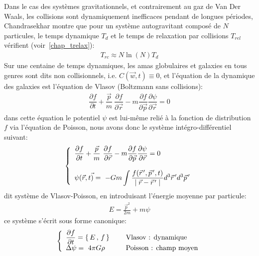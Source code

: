 Dans le cas des systèmes gravitationnels, et contrairement au gaz de Van Der Waals, les collisions sont dynamiquement inefficaces pendant de longues
périodes, Chandrasekhar montre que pour un système autogravitant composé de $N$ particules, le temps dynamique $T_{d}$ et le temps de
relaxation par collisions $T_{rel}$ vérifient (voir~\ref{chap_trelax}):
\begin{align*}
	T_{rc}\approx N\ln\left(  N\right)  T_{d}%
\end{align*}
Sur une centaine de temps dynamiques, les amas globulaires et galaxies en tous genres sont dits non collisionnels, i.e. $C\left(  \vec{w}
,t\right)  \equiv0$, et l'équation de la dynamique des galaxies est l'équation de Vlasov (Boltzmann sans collisions):
\begin{align*}
	\dfrac{\partial f}{\partial t}+\dfrac{\vec{p}}{m}\ \dfrac{\partial f}{\partial\vec{r}}-m\dfrac{\partial f}{\partial\vec{p}}\dfrac
	{\partial\psi}{\partial\vec{r}}=0
\end{align*}
dans cette équation le potentiel $\psi$ est lui-même relié à la fonction de distribution $f$ via l'équation de Poisson, nous avons donc le système
intégro-différentiel suivant:
\begin{align*}
	\left\{
		\begin{array}[c]{l}%
			\dfrac{\partial f}{\partial t}+\dfrac{\vec{p}}{m}\ \dfrac{\partial f}{\partial\vec{r}}-m\dfrac{\partial f}{\partial\vec{p}}\dfrac
			{\partial\psi}{\partial\vec{r}}=0\\
			\\
			\psi(\vec{r},t\vec{)}=~-Gm\displaystyle\int\dfrac{f(\vec{r}^{\,\prime},\vec{p}^{\,\prime},t)}{\mid\vec{r}-\vec{r}^{\,\prime}\mid}%
			d^{3}\vec{r}^{\,\prime}d^{3}\vec{p}^{\,\prime}%
		\end{array}
	\right.
\end{align*}
dit système de Vlasov-Poisson, en introduisant l'énergie moyenne par particule:
\begin{align*}
	E=\frac{\vec{p}^{2}}{2m}+m\psi
\end{align*}
ce système s'écrit sous forme canonique:
\begin{align*}
	\left\{
		\begin{array}[c]{lll}%
			\dfrac{\partial f}{\partial t}=\left\{  \,E\,,\,f\,\right\}   &  & \text{{\ {Vlasov} : dynamique}}\\
			\Delta\psi=~4\pi G\rho &  & \text{{\ {Poisson} : champ {moyen}}}%
		\end{array}
	\right.
\end{align*}


